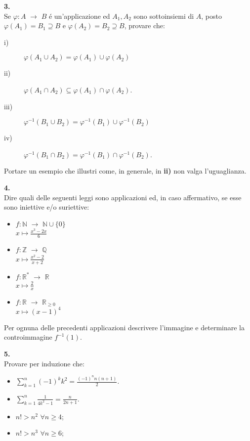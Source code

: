 \documentclass[italian,a4paper,11pt]
{article}
\newcommand{\Q}{\mathbb{Q}}
\newcommand{\Z}{\mathbb Z}
\newcommand{\R}{\mathbb{R}}
\newcommand{\N}{\mathbb{N}}
\begin{document}
\vspace{0.4cm}
\noindent
\begin{Ex}\textbf{ 3.}\\
Se $\varphi : A$ $\longrightarrow$ $B$ \'e un'applicazione ed $A_1,A_2$ sono sottoinsiemi di $A$, posto $\varphi(A_1)=B_1\supseteq B$ e $\varphi(A_2)=B_2\supseteq B$, provare che:
\begin{description}
	\item[i)] $\varphi(A_1 \cup A_2)=\varphi(A_1) \cup \varphi(A_2)$
	\item[ii)] $\varphi(A_1 \cap A_2)\subseteq\varphi(A_1) \cap \varphi(A_2)$.
   	\item[iii)] $\varphi^{-1}(B_1 \cup B_2)=\varphi^{-1}(B_1) \cup \varphi^{-1}(B_2)$
	\item[iv)] $\varphi^{-1}(B_1 \cap B_2)=\varphi^{-1}(B_1) \cap \varphi^{-1}(B_2)$.
\end{description}
Portare un esempio che illustri come, in generale, in \textbf{ii)} non valga l'uguaglianza.
\end{Ex}

\vspace{0.4cm}
\noindent
\begin{Ex}\textbf{ 4.}\\
Dire quali delle seguenti leggi sono applicazioni ed, in caso affermativo, se esse sono iniettive e/o suriettive:
\begin{itemize}
	\item $f:\N$ $\longrightarrow$ $\N \cup \{0\}$\\
			$x \longmapsto \frac{x^3-2x}{6}$
	\item $f:\Z$ $\longrightarrow$ $\Q$\\
			$x \longmapsto \frac{x^2-2}{x+2}$	
	\item $f:\R^*$ $\longrightarrow$ $\R$\\
			$x \longmapsto \frac{2}{x}$	
	\item $f:\R$ $\longrightarrow$ $\R_{\geq 0}$\\
			$x \longmapsto (x-1)^4$
\end{itemize}
Per ognuna delle precedenti applicazioni descrivere l'immagine e determinare la controimmagine $f^{-1}(1)$.
\end{Ex}



\vspace{0.4cm}
\noindent
\begin{Ex}\textbf{ 5.}\\
Provare per induzione che:
\begin{itemize}
	\item $\displaystyle \sum_{k=1}^n (-1)^k k^2 =\frac{(-1)^n n(n+1)}{2}$.
	\item $\displaystyle \sum_{k=1}^n \frac{1}{4k^2-1} =\frac{n}{2n+1}$.
	\item $n!>n^2$		$\forall n\geq 4$;	
	\item $n!>n^3$		$\forall n\geq 6$;
\end{itemize}
\end{Ex}
\end{document}
